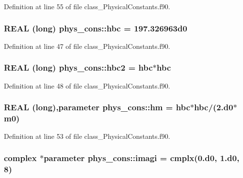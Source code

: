 Definition at line 55 of file class\_\-PhysicalConstants.f90.

\hypertarget{namespacephys__cons_a2d3539e3579b581a4e69eff7347b4fa2}{
\subsubsection[{hbc}]{\setlength{\rightskip}{0pt plus 5cm}REAL (long) {\bf phys\_\-cons::hbc} = 197.326963d0}}
\label{namespacephys__cons_a2d3539e3579b581a4e69eff7347b4fa2}


Definition at line 47 of file class\_\-PhysicalConstants.f90.

\hypertarget{namespacephys__cons_a030a10874bc73b7d042adb32fad75614}{
\subsubsection[{hbc2}]{\setlength{\rightskip}{0pt plus 5cm}REAL (long) {\bf phys\_\-cons::hbc2} = {\bf hbc}$\ast${\bf hbc}}}
\label{namespacephys__cons_a030a10874bc73b7d042adb32fad75614}


Definition at line 48 of file class\_\-PhysicalConstants.f90.

\hypertarget{namespacephys__cons_ad97ad749ef4f8f66c56a0facb7394cb5}{
\subsubsection[{hm}]{\setlength{\rightskip}{0pt plus 5cm}REAL (long),parameter {\bf phys\_\-cons::hm} = {\bf hbc}$\ast${\bf hbc}/(2.d0$\ast${\bf m0})}}
\label{namespacephys__cons_ad97ad749ef4f8f66c56a0facb7394cb5}


Definition at line 53 of file class\_\-PhysicalConstants.f90.

\hypertarget{namespacephys__cons_af15f96806bfb6b9c6b1a279971d5d34b}{
\subsubsection[{imagi}]{\setlength{\rightskip}{0pt plus 5cm}complex $\ast$parameter {\bf phys\_\-cons::imagi} = cmplx(0.d0, 1.d0, 8)}}
\label{namespacephys__cons_af15f96806bfb6b9c6b1a279971d5d34b}


